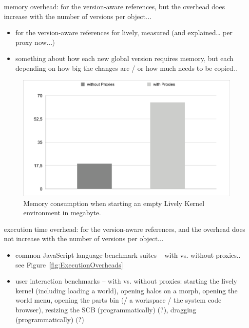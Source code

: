 memory overhead: for the version-aware references, but the overhead does increase with the number of versions per object...
\begin{itemize}
    \item for the version-aware references for lively, measured (and explained… per proxy now...)
    \item something about how each new global version requires memory, but each depending on how big the changes are / or how much needs to be copied..
\end{itemize}


\begin{figure}[h]
    \centering
    \includegraphics[width=\textwidth]{figures/memoryOverhead.pdf}
    \caption{Memory consumption when starting an empty Lively Kernel environment in megabyte.}
    \label{fig:ExecutionOverhead}
\end{figure}

execution time overhead: for the version-aware references, and the overhead does not increase with the number of versions per object...
\begin{itemize}
    \item common JavaScript language benchmark suites – with vs. without proxies.. see Figure~\ref{fig:ExecutionOverheads}
    \item user interaction benchmarks – with vs. without proxies: starting the lively kernel (including loading a world), opening halos on a morph, opening the world menu, opening the parts bin (/ a workspace / the system code browser), resizing the SCB (programmatically) (?), dragging (programmatically) (?)
\end{itemize}


